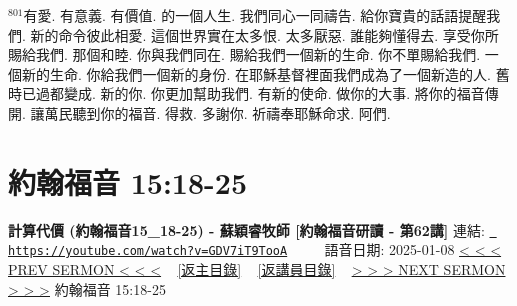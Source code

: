 \documentclass{book}
\begin{document}
$^{801}$有愛.
有意義.
有價值.
的一個人生.
我們同心一同禱告.
給你寶貴的話語提醒我們.
新的命令彼此相愛.
這個世界實在太多恨.
太多厭惡.
誰能夠懂得去.
享受你所賜給我們.
那個和睦.
你與我們同在.
賜給我們一個新的生命.
你不單賜給我們.
一個新的生命.
你給我們一個新的身份.
在耶穌基督裡面我們成為了一個新造的人.
舊時已過都變成.
新的你.
你更加幫助我們.
有新的使命.
做你的大事.
將你的福音傳開.
讓萬民聽到你的福音.
得救.
多謝你.
祈禱奉耶穌命求.
阿們.
\newpage



\section{約翰福音 15:18-25}
\label{sec:GDV7iT9TooA}
\textbf{計算代價 (約翰福音15\_18-25) - 蘇穎睿牧師 [約翰福音研讀 - 第62講]}
\newline
\newline
連結: \href{https://youtube.com/watch?v=GDV7iT9TooA}{\texttt{ https://youtube.com/watch?v=GDV7iT9TooA}} ~~~~ 語音日期: 2025-01-08 
\newline
\newline
\hyperref[sec:prT7wwZLltI]{< < < PREV SERMON < < <}
~
\hyperlink{toc}{[返主目錄]}
~
\hyperref[ch:preacher9]{[返講員目錄]}
~
\hyperref[sec:pF1FrHKEPww]{> > > NEXT SERMON > > >}
\newline
\newline
約翰福音 15:18-25
\newline
\end{document}
